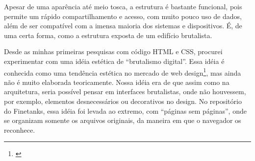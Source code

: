 Apesar de uma aparência até meio tosca, a estrutura é bastante funcional, pois permite um rápido compartilhamento e acesso, com muito pouco uso de dados, além de ser compatível com a imensa maioria dos sistemas e dispositivos. É, de uma certa forma, como a estrutura exposta de um edifício brutalista. %

Desde as minhas primeiras pesquisas com código HTML e CSS, procurei experimentar com uma idéia estética de ``brutalismo digital''. Essa idéia é conhecida como uma tendência estética no mercado de web design\footnote{\cite{Hill2017}}, mas ainda não é muito elaborada teoricamente. Nossa idéia era de que assim como na arquitetura, seria possível pensar em interfaces brutalistas, onde não houvessem, por exemplo, elementos desnecessários ou decorativos no design. No repositório do Finetanks, essa idéia foi levada ao extremo, com ``páginas sem páginas'', onde se organizam somente os arquivos originais, da maneira em que o navegador os reconhece.  



